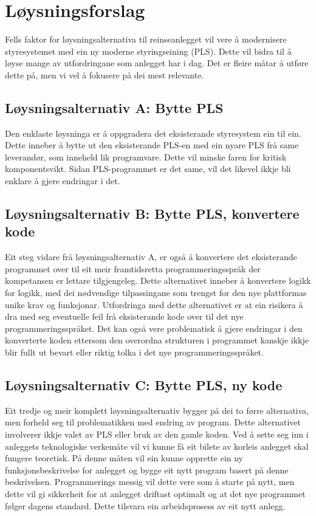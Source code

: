 \newpage
\section{Løysningsforslag}

Fells faktor for løysningsalternativa til reinseanlegget vil vere å modernisere
styresystemet med ein ny moderne styringseining (PLS). 
Dette vil bidra til å løyse mange av utfordringane som anlegget har i dag.
Det er fleire måtar å utføre dette på, men vi vel å fokusere på dei mest relevante.
\newline
\subsection{Løysningsalternativ A: Bytte PLS}
Den enklaste løysninga er å oppgradera det eksisterande styresystem ein til ein. 
Dette inneber å bytte ut den eksisterande PLS-en med ein nyare PLS frå same leverandør, som inneheld lik programvare.
Dette vil minske faren for kritisk komponentsvikt. Sidan PLS-programmet er det same, 
vil det likevel ikkje bli enklare å gjere endringar i det.

\subsection{Løysningsalternativ B: Bytte PLS, konvertere kode}
Eit steg vidare frå løysningsalternativ A, er også å konvertere det eksisterande programmet over til eit meir
framtidsretta programmeringsspråk der kompetansen er lettare tilgjengeleg. Dette alternativet inneber å konvertere logikk for logikk,
med dei nødvendige tilpassingane som trengst for den nye plattformas unike krav og funksjonar.
\newline \newline
Utfordringa med dette alternativet er at ein risikera å dra med seg eventuelle feil frå eksisterande
kode over til det nye programmeringsspråket. Det kan også vere problematisk å gjere endringar
i den konverterte koden ettersom den overordna strukturen i programmet
kanskje ikkje blir fullt ut bevart eller riktig tolka i det nye programmeringsspråket.

\subsection{Løysningsalternativ C: Bytte PLS, ny kode}
Eit tredje og meir komplett løysningsalternativ bygger på dei to førre alternativa, men forheld seg til problematikken med endring av program.
Dette alternativet involverer ikkje valet av PLS eller bruk av den gamle koden.
\newline \newline
Ved å sette seg inn i anleggets teknologiske verkemåte vil vi kunne få eit bilete av korleis anlegget skal fungere teoretisk.
På denne måten vil ein kunne opprette ein ny funksjonsbeskrivelse for anlegget og bygge eit nytt program basert på denne beskrivelsen.
Programmerings messig vil dette vere som å starte på nytt, men dette vil gi sikkerheit for at anlegget driftast optimalt og at det nye programmet følger
dagens standard. Dette tilsvara ein arbeidsprosess av eit nytt anlegg.

